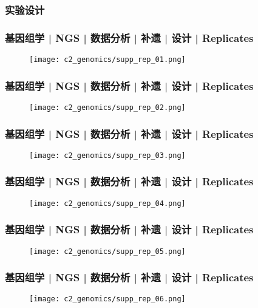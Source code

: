 \subsubsection{实验设计}
\begin{frame}
  \frametitle{基因组学 | NGS | 数据分析 | 补遗 | 设计 | Replicates}
  \begin{figure}
    \centering
    \texttt{[image: c2\_genomics/supp\_rep\_01.png]}
  \end{figure}
\end{frame}

\begin{frame}
  \frametitle{基因组学 | NGS | 数据分析 | 补遗 | 设计 | Replicates}
  \begin{figure}
    \centering
    \texttt{[image: c2\_genomics/supp\_rep\_02.png]}
  \end{figure}
\end{frame}

\begin{frame}
  \frametitle{基因组学 | NGS | 数据分析 | 补遗 | 设计 | Replicates}
  \begin{figure}
    \centering
    \texttt{[image: c2\_genomics/supp\_rep\_03.png]}
  \end{figure}
\end{frame}

\begin{frame}
  \frametitle{基因组学 | NGS | 数据分析 | 补遗 | 设计 | Replicates}
  \begin{figure}
    \centering
    \texttt{[image: c2\_genomics/supp\_rep\_04.png]}
  \end{figure}
\end{frame}

\begin{frame}
  \frametitle{基因组学 | NGS | 数据分析 | 补遗 | 设计 | Replicates}
  \begin{figure}
    \centering
    \texttt{[image: c2\_genomics/supp\_rep\_05.png]}
  \end{figure}
\end{frame}

\begin{frame}
  \frametitle{基因组学 | NGS | 数据分析 | 补遗 | 设计 | Replicates}
  \begin{figure}
    \centering
    \texttt{[image: c2\_genomics/supp\_rep\_06.png]}
  \end{figure}
\end{frame}

